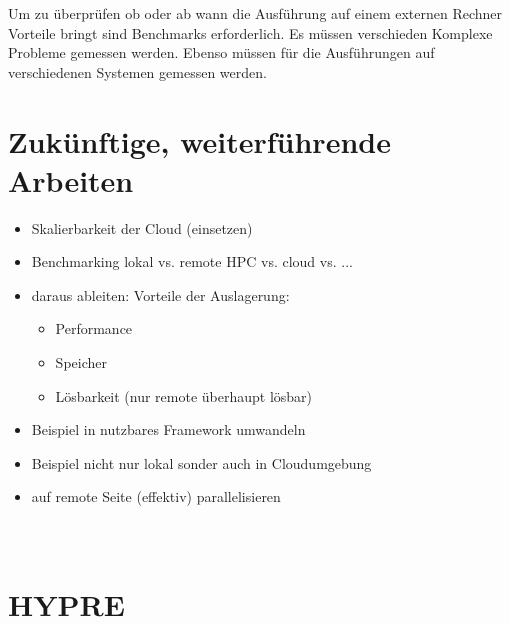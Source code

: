 \documentclass[a4paper,10pt]{article}
\numberwithin{figure}{section}
\numberwithin{table}{section}
\begin{document}
Um zu überprüfen ob oder ab wann die Ausführung auf einem externen Rechner Vorteile bringt sind Benchmarks erforderlich.
Es müssen verschieden Komplexe Probleme gemessen werden.
Ebenso müssen für die Ausführungen auf verschiedenen Systemen gemessen werden.

\newpage













\section{Zukünftige, weiterführende Arbeiten}


\begin{itemize}
 \item Skalierbarkeit der Cloud (einsetzen)
 \item Benchmarking lokal vs. remote HPC vs. cloud vs. ...
 \item daraus ableiten: Vorteile der Auslagerung:
  \begin{itemize}
    \item Performance
    \item Speicher
    \item Lösbarkeit (nur remote überhaupt lösbar)
  \end{itemize}
 \item Beispiel in nutzbares Framework umwandeln
 \item Beispiel nicht nur lokal sonder auch in Cloudumgebung
 \item auf remote Seite (effektiv) parallelisieren
\end{itemize}

\newpage











\newpage










\appendix
\section{\\HYPRE}
\end{document}
